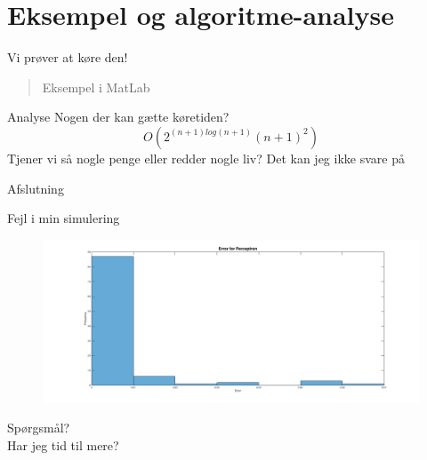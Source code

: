 \documentclass[12pt,t]{beamer}
\begin{document}
\section{Eksempel og algoritme-analyse}
\frame{\tableofcontents[currentsection]}
    \begin{frame}[t]{Vi prøver at køre den!}
        \begin{quote}
            Eksempel i MatLab
        \end{quote}
        \pause
        \begin{block}{Analyse}
            Nogen der kan gætte køretiden? \pause
            $$
                O(2^{(n+1) log(n+1)} (n + 1)^2)
                $$
                Tjener vi så nogle penge eller redder nogle liv?
                \pause
                Det kan jeg ikke svare på \Frowny{}
            \end{block}
    \end{frame}

    \begin{frame}[t]{Afslutning}
    \begin{block}{Fejl i min simulering}
        \begin{figure}[h!]
            \centering
            \includegraphics[width=1\textwidth]{histperc.png}
        \end{figure}
    \end{block}
    \pause
    \centering Spørgsmål?\\
    \pause
    Har jeg tid til mere?
    \end{frame}
\end{document}
